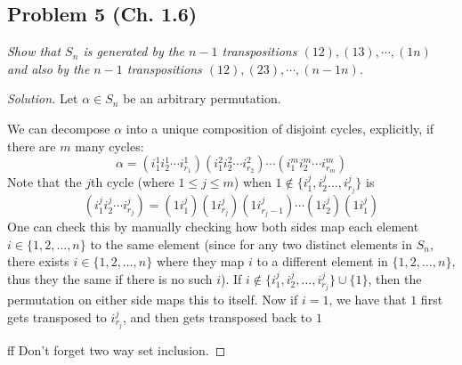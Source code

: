 \documentclass{article}
\begin{document}
\subsection*{Problem 5 (Ch. 1.6)}
{\it Show that $S_n$ is generated by the $n-1$ transpositions
$(12), (13), \cdots, (1n)$ and also by the $n-1$ transpositions
$(12),(23),\cdots,(n-1n)$.}
\begin{proof}[Solution]\let\qed\relax
	Let $\alpha \in S_n$ be an arbitrary permutation.

	We can decompose $\alpha$ into a unique composition of disjoint cycles,
	explicitly, if there are $m$ many cycles:
	\[
		\alpha = (i_1^1 i_2^1 \cdots i_{r_1}^1)(i_1^2 i_2^2 \cdots i_{r_2}^2)
		\cdots (i_1^m i_2^m \cdots i_{r_m}^m)
	\]
	Note that the $j$th cycle (where $1 \leq j \leq m$) when $1 \not\in \{i_1^j,i_2^j\dots,i_{r_j}^j\}$ is
	\[
		(i_1^j i_2^j \cdots i_{r_j}^j) = (1 i_1^j)(1 i_{r_j}^j) (1 i_{r_j-1}^j) \cdots(1 i_2^j) (1 i_1^j)
	\]
	One can check this by manually checking how both sides map each element $i \in \{1,2,\dots,n\}$
	to the same element
	(since for any two distinct elements in $S_n$,
	there exists $i\in \{1,2,\dots,n\}$ where they
	map $i$ to a different element in $\{1,2,\dots,n\}$,
	thus they the same if there is no such $i$).
	If $i \not\in \{i_1^{j},i_2^{j},\dots,i_{r_j}^j\} \cup \{1\}$,
	then the permutation on either side maps this to itself.
	Now if $i = 1$, we have that $1$ first gets transposed to $i^j_{r_j}$,
	and then gets transposed back to $1$ 

	ff Don't forget two way set inclusion.
\end{proof}
\end{document}
